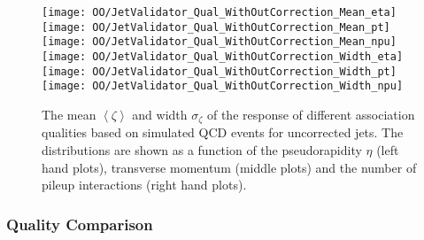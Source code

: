 \begin{figure}[Ht]
    \centering
    \texttt{[image: OO/JetValidator\_Qual\_WithOutCorrection\_Mean\_eta]}
    \texttt{[image: OO/JetValidator\_Qual\_WithOutCorrection\_Mean\_pt]}
    \texttt{[image: OO/JetValidator\_Qual\_WithOutCorrection\_Mean\_npu]}
    \\
    \texttt{[image: OO/JetValidator\_Qual\_WithOutCorrection\_Width\_eta]}
    \texttt{[image: OO/JetValidator\_Qual\_WithOutCorrection\_Width\_pt]}
    \texttt{[image: OO/JetValidator\_Qual\_WithOutCorrection\_Width\_npu]}
    \caption[Mean and width of the \pt{} response of different association qualities based on simulated QCD events for uncorrected jets]{The mean $\left<\zeta\right>$ and width $\sigma_{\zeta}$ of the \pt{} response of different association qualities based on simulated QCD events for uncorrected jets. The distributions are shown as a function of the pseudorapidity $\eta$ (left hand plots), transverse momentum (middle plots) and the number of pileup interactions (right hand plots). \label{plot:OOJetsPtResponseQualWO}}
\end{figure}


\subsubsection{Quality Comparison \label{sec:OOJetsPtResponseQuality} }


